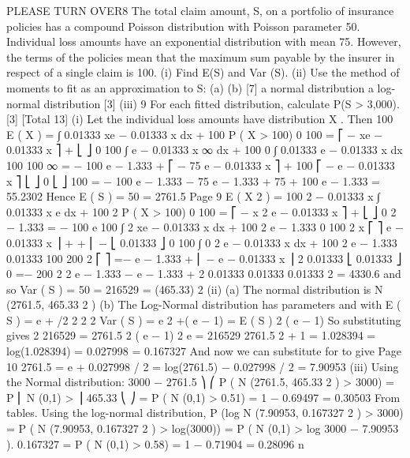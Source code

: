 PLEASE TURN OVER8
The total claim amount, S, on a portfolio of insurance policies has a compound
Poisson distribution with Poisson parameter 50. Individual loss amounts have an
exponential distribution with mean 75. However, the terms of the policies mean that
the maximum sum payable by the insurer in respect of a single claim is 100.
(i) Find E(S) and Var (S).
(ii) Use the method of moments to fit as an approximation to S:
(a)
(b)
[7]
a normal distribution
a log-normal distribution
[3]
(iii)
9
For each fitted distribution, calculate P(S > 3,000).
[3]
[Total 13]
(i)
Let the individual loss amounts have distribution X . Then
100
E ( X ) =
∫ 0.01333 xe
− 0.01333 x
dx + 100 \times  P ( X > 100)
0
100
= ⎡ − xe − 0.01333 x ⎤ +
⎣
⎦ 0
100
∫ e
− 0.01333 x
∞
dx + 100
0
∫ 0.01333 e
− 0.01333 x
dx
100
100
∞
= − 100 e − 1.333 + ⎡ − 75 e − 0.01333 x ⎤ + 100 ⎡ − e − 0.01333 x ⎤
⎣
⎦ 0
⎣
⎦ 100
= − 100 e − 1.333 − 75 e − 1.333 + 75 + 100 e − 1.333
= 55.2302
Hence E ( S ) = 50  = 2761.5
Page 9%
E ( X 2 ) =
100
2 − 0.01333 x
∫ 0.01333 x e
dx + 100 2 P ( X > 100)
0
100
= ⎡ − x 2 e − 0.01333 x ⎤ +
⎣
⎦ 0
2 − 1.333
= − 100 e
100
∫ 2 xe
− 0.01333 x
dx + 100 2 e − 1.333
0
100
2 x
⎡
⎤
e − 0.01333 x ⎥ +
+ ⎢ −
⎣ 0.01333
⎦ 0
100
∫
0
2
e − 0.01333 x dx + 100 2 e − 1.333
0.01333
100
200
2
⎡
⎤
=−
e − 1.333 + ⎢ −
e − 0.01333 x ⎥
2
0.01333
⎣ 0.01333
⎦ 0
=−
200
2
2
e − 1.333 −
e − 1.333 +
2
0.01333
0.01333
0.01333 2
= 4330.6
and so
Var ( S ) = 50  = 216529 = (465.33) 2
(ii)
(a) The normal distribution is N (2761.5, 465.33 2 )
(b) The Log-Normal distribution has parameters \mu and \sigma with
E ( S ) = e \mu+
/2
2
2
2
Var ( S ) = e 2 \mu+\sigma ( e \sigma − 1) = E ( S ) 2 \times  ( e \sigma − 1)
So substituting gives
2
216529 = 2761.5 2 \times  ( e \sigma − 1)
2
e \sigma =
216529
2761.5 2
+ 1 = 1.028394
 = log(1.028394) = 0.027998
\sigma = 0.167327
And now we can substitute for \sigma to give
Page 10%
2761.5 = e \mu+ 0.027998 / 2
\mu = log(2761.5) − 0.027998 / 2 = 7.90953
(iii)
Using the Normal distribution:
3000 − 2761.5 ⎞
⎛
P ( N (2761.5, 465.33 2 ) > 3000) = P ⎜ N (0,1) >
⎟
465.33
⎝
⎠
= P ( N (0,1) > 0.51) = 1 − 0.69497 = 0.30503
From tables.
Using the log-normal distribution,
P (log N (7.90953, 0.167327 2 ) > 3000) = P ( N (7.90953, 0.167327 2 ) > log(3000))
= P ( N (0,1) >
log 3000 − 7.90953
).
0.167327
= P ( N (0,1) > 0.58) = 1 − 0.71904 = 0.28096
n
